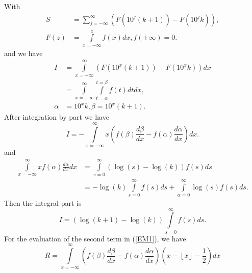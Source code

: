 \documentclass[titlepage,fleqn]{article}%
\begin{document}
With
\begin{align*}
S  &  =%
{\displaystyle\sum\limits_{j=-\infty}^{\infty}}
\left(  F(10^{j}(k+1))-F(10^{j}k)\right)  ,\\
F(z)  &  =%
{\displaystyle\int\limits_{x=-\infty}^{z}}
f(x)dx,f(\pm\infty)=0.
\end{align*}
and we have%
\begin{align}
I  &  =%
{\displaystyle\int\limits_{x=-\infty}^{\infty}}
\left(  F(10^{x}(k+1))-F(10^{x}k)\right)  dx\label{EM2}\\
&  =%
{\displaystyle\int\limits_{x=-\infty}^{\infty}}
{\displaystyle\int\limits_{t=\alpha}^{t=\beta}}
f(t)dtdx,\nonumber\\
\alpha &  =10^{x}k,\beta=10^{x}(k+1).\nonumber
\end{align}
After integration by part we have%
\[
I=-%
{\displaystyle\int\limits_{x=-\infty}^{\infty}}
x\left(  f(\beta)\frac{d\beta}{dx}-f(\alpha)\frac{d\alpha}{dx}\right)  dx.
\]
and%
\begin{align*}%
{\displaystyle\int\limits_{x=-\infty}^{\infty}}
xf(\alpha)\frac{d\alpha}{dx}dx  &  =%
{\displaystyle\int\limits_{s=0}^{\infty}}
\left(  \log(s)-\log(k)\right)  f(s)ds\\
&  =-\log(k)%
{\displaystyle\int\limits_{s=0}^{\infty}}
f(s)ds+%
{\displaystyle\int\limits_{\alpha=0}^{\infty}}
\log(s)f(s)ds.
\end{align*}
Then the integral part is%
\begin{equation}
I=\left(  \log(k+1)-\log(k)\right)
{\displaystyle\int\limits_{s=0}^{\infty}}
f(s)ds. \label{Iform}%
\end{equation}
For the evaluation of the second term in (\ref{EM1}), we have%
\[
R=%
{\displaystyle\int\limits_{x=-\infty}^{\infty}}
\left(  f(\beta)\frac{d\beta}{dx}-f(\alpha)\frac{d\alpha}{dx}\right)  \left(
x-\left\lfloor x\right\rfloor -\frac{1}{2}\right)  dx
\]
\end{document}
